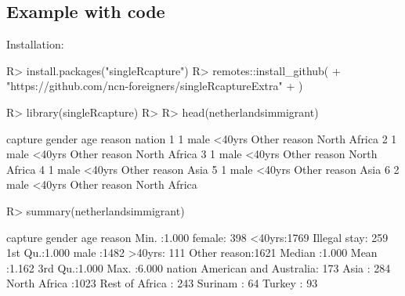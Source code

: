 \documentclass[
]{jss}
\newcommand{\1}{\mathcal{I}} \newcommand{\bx}{\boldsymbol{x}}
\begin{document}
\subsection[Example with R code]{Example with 
code}\label{r-code}

Installation:

\begin{CodeChunk}
\begin{CodeInput}
R> install.packages("singleRcapture")
R> remotes::install_github(
+   "https://github.com/ncn-foreigners/singleRcaptureExtra"
+ )
\end{CodeInput}
\end{CodeChunk}

\begin{CodeChunk}
\begin{CodeInput}
R> library(singleRcapture)
R> 
R> head(netherlandsimmigrant)
\end{CodeInput}
\begin{CodeOutput}
  capture gender    age       reason       nation
1       1   male <40yrs Other reason North Africa
2       1   male <40yrs Other reason North Africa
3       1   male <40yrs Other reason North Africa
4       1   male <40yrs Other reason         Asia
5       1   male <40yrs Other reason         Asia
6       2   male <40yrs Other reason North Africa
\end{CodeOutput}
\end{CodeChunk}

\begin{CodeChunk}
\begin{CodeInput}
R> summary(netherlandsimmigrant)
\end{CodeInput}
\begin{CodeOutput}
    capture         gender         age                reason    
 Min.   :1.000   female: 398   <40yrs:1769   Illegal stay: 259  
 1st Qu.:1.000   male  :1482   >40yrs: 111   Other reason:1621  
 Median :1.000                                                  
 Mean   :1.162                                                  
 3rd Qu.:1.000                                                  
 Max.   :6.000                                                  
                    nation    
 American and Australia: 173  
 Asia                  : 284  
 North Africa          :1023  
 Rest of Africa        : 243  
 Surinam               :  64  
 Turkey                :  93  
\end{CodeOutput}
\end{CodeChunk}
\end{document}
